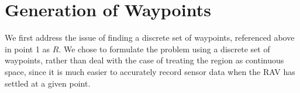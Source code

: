 
\section{Generation of Waypoints}\label{sec:GenerationOfWaypoints}
We first address the issue of finding a discrete set of waypoints, referenced above in point 1 as $R$. We chose to formulate the problem using a discrete set of waypoints, rather than deal with the case of treating the region as continuous space, since it is much easier to accurately record sensor data when the RAV has settled at a given point.


